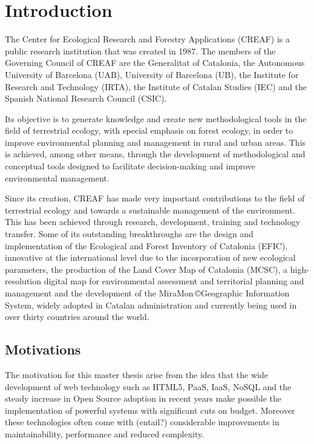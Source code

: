 \chapter{Introduction}

The Center for Ecological Research and Forestry Applications (CREAF) is a public research institution that was created in 1987.  The members of the Governing Council of CREAF are the Generalitat of Catalonia, the Autonomous University of Barcelona (UAB), University of Barcelona (UB), the Institute for Research and Technology (IRTA), the Institute of Catalan Studies (IEC) and the Spanish National Research Council (CSIC).

Its objective is to generate knowledge and create new methodological tools in the field of terrestrial ecology, with special emphasis on forest ecology, in order to improve environmental planning and management in rural and urban areas. This is achieved, among other means, through the development of methodological and conceptual tools designed to facilitate decision-making and improve environmental management.

Since its creation, CREAF has made very important contributions to the field of terrestrial ecology and towards a sustainable management of the environment. This has been achieved through research, development, training and technology transfer. Some of its outstanding breakthroughs are the design and implementation of the Ecological and Forest Inventory of Catalonia (EFIC), innovative at the international level due to the incorporation of new ecological parameters, the production of the Land Cover Map of Catalonia (MCSC), a high-resolution digital map for environmental assessment and territorial planning and management and the development of the MiraMon \copyright  Geographic Information System, widely adopted in Catalan administration and currently being used in over thirty countries around the world.


\section{Motivations}

The motivation for this master thesis arise from the idea that the wide development of web technology such as HTML5, PaaS, IaaS, NoSQL and the steady increase in Open Source adoption in recent years make possible the implementation of powerful systems with significant cuts on budget. Moreover these technologies often come with (entail?) considerable improvements in maintainability, performance and reduced complexity.

